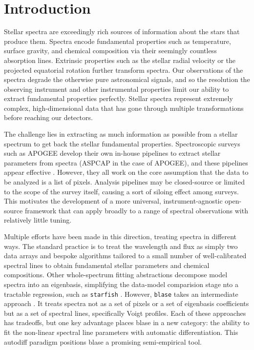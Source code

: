 \documentclass[twocolumn]{aastex631}
\begin{document}

\section{Introduction}
Stellar spectra are exceedingly rich sources of information about the stars
that produce them. Spectra encode fundamental properties such as temperature, 
surface gravity, and chemical composition via their seemingly countless 
absorption lines. Extrinsic properties such as the stellar radial velocity or 
the projected equatorial rotation further transform spectra. Our observations 
of the spectra degrade the otherwise pure astronomical signals, and so the 
resolution the observing instrument and other instrumental properties limit 
our ability to extract fundamental properties perfectly. Stellar spectra 
represent extremely complex, high-dimensional data that has gone through 
multiple transformations before reaching our detectors.

The challenge lies in extracting as much information as possible from
a stellar spectrum to get back the stellar fundamental properties. 
Spectroscopic surveys such as APOGEE develop their own in-house pipelines to extract stellar parameters
from spectra (ASPCAP in the case of APOGEE), and these pipelines appear
effective \citep{APOGEE, ASPCAP}. However, they all work on the core assumption that the data to be 
analyzed is a list of pixels. Analysis pipelines may be closed-source or limited to the scope of the survey itself, causing a sort of siloing effect among surveys. This motivates the 
development of a more universal, instrument-agnostic open-source framework that can apply broadly to a range of spectral observations with relatively little tuning.

Multiple efforts have been made in this direction, treating spectra in 
different ways. The standard practice is to treat the wavelength and flux as 
simply two data arrays and bespoke algorithms tailored to a small number of well-calibrated spectral lines to obtain fundamental stellar parameters and chemical compositions. Other whole-spectrum fitting abstractions decompose model spectra into an eigenbasis, simplifying the data-model comparision stage nto a tractable regression, such as \texttt{starfish} \citep{starfish}. However, \texttt{blase} takes 
an intermediate approach . 
It treats spectra not as a set of pixels or a set of  eigenbasis coefficients but as a set of spectral lines, specifically Voigt profiles. Each of these approaches has tradeoffs, but one key advantage places blase in a new category: the ability to fit the non-linear spectral line parameters with automatic differentiation.  This autodiff paradigm positions blase a promising semi-empirical tool.
\end{document}
